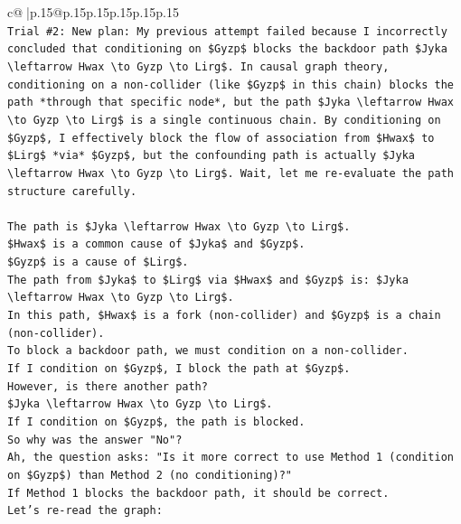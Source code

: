 \documentclass{article}
\begin{document}
{\begin{supertabular}{c@{$\;$}|p{.15\linewidth}@{}p{.15\linewidth}p{.15\linewidth}p{.15\linewidth}p{.15\linewidth}p{.15\linewidth}}
{{{\\ 
\texttt{Trial \#2: New plan: My previous attempt failed because I incorrectly concluded that conditioning on \$Gyzp\$ blocks the backdoor path \$Jyka \textbackslash{}leftarrow Hwax \textbackslash{}to Gyzp \textbackslash{}to Lirg\$. In causal graph theory, conditioning on a non{-}collider (like \$Gyzp\$ in this chain) blocks the path *through that specific node*, but the path \$Jyka \textbackslash{}leftarrow Hwax \textbackslash{}to Gyzp \textbackslash{}to Lirg\$ is a single continuous chain. By conditioning on \$Gyzp\$, I effectively block the flow of association from \$Hwax\$ to \$Lirg\$ *via* \$Gyzp\$, but the confounding path is actually \$Jyka \textbackslash{}leftarrow Hwax \textbackslash{}to Gyzp \textbackslash{}to Lirg\$. Wait, let me re{-}evaluate the path structure carefully.} \\
\\ 
\texttt{The path is \$Jyka \textbackslash{}leftarrow Hwax \textbackslash{}to Gyzp \textbackslash{}to Lirg\$.} \\
\texttt{\$Hwax\$ is a common cause of \$Jyka\$ and \$Gyzp\$.} \\
\texttt{\$Gyzp\$ is a cause of \$Lirg\$.} \\
\texttt{The path from \$Jyka\$ to \$Lirg\$ via \$Hwax\$ and \$Gyzp\$ is: \$Jyka \textbackslash{}leftarrow Hwax \textbackslash{}to Gyzp \textbackslash{}to Lirg\$.} \\
\texttt{In this path, \$Hwax\$ is a fork (non{-}collider) and \$Gyzp\$ is a chain (non{-}collider).} \\
\texttt{To block a backdoor path, we must condition on a non{-}collider.} \\
\texttt{If I condition on \$Gyzp\$, I block the path at \$Gyzp\$.} \\
\texttt{However, is there another path?} \\
\texttt{\$Jyka \textbackslash{}leftarrow Hwax \textbackslash{}to Gyzp \textbackslash{}to Lirg\$.} \\
\texttt{If I condition on \$Gyzp\$, the path is blocked.} \\
\texttt{So why was the answer "No"?} \\
\texttt{Ah, the question asks: "Is it more correct to use Method 1 (condition on \$Gyzp\$) than Method 2 (no conditioning)?"} \\
\texttt{If Method 1 blocks the backdoor path, it should be correct.} \\
\texttt{Let's re{-}read the graph:} \\
}}}
\end{supertabular}}
\end{document}
